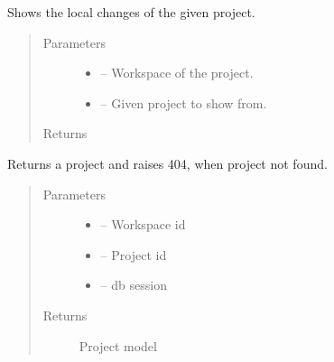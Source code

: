 \documentclass[letterpaper,10pt,english]{sphinxmanual}
\begin{document}

\begin{fulllineitems}
\label{_source/son_editor.impl:son_editor.impl.gitimpl.diff}
Shows the local changes of the given project.
\begin{quote}\begin{description}
\item[{Parameters}] \leavevmode\begin{itemize}
\item {} 
 -- Workspace of the project.

\item {} 
 -- Given project to show from.

\end{itemize}

\item[{Returns}] \leavevmode


\end{description}\end{quote}

\end{fulllineitems}


\begin{fulllineitems}
\label{_source/son_editor.impl:son_editor.impl.gitimpl.get_project}
Returns a project and raises 404, when project not found.
\begin{quote}\begin{description}
\item[{Parameters}] \leavevmode\begin{itemize}
\item {} 
 -- Workspace id

\item {} 
 -- Project id

\item {} 
 -- db session

\end{itemize}

\item[{Returns}] \leavevmode
Project model

\end{description}\end{quote}

\end{fulllineitems}
\end{document}
